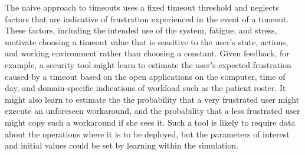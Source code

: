 \documentclass{acm_proc_article-sp}
\newcommand{\ignore}[1] {}
\begin{document}
\ignore{\subsection{An Alternative To The Standard Approach}}

The naive approach to timeouts uses a fixed timeout threshold and
neglects factors that are indicative of frustration experienced in the
event of a timeout. These factors, including the intended use of the
system, fatigue, and stress, motivate choosing a timeout value that is
sensitive to the user's state, actions, and working environment rather
than choosing a constant. Given feedback, for example, a security tool
might learn to estimate the user's expected frustration caused by a
timeout based on the open applications on the computer, time of day,
and domain-specific indications of workload such as the patient
roster.  \ignore{At the same time it might learn to estimate the
  probability of a vulnerability caused by a lengthened timeout in the
  same way and use the two values to reason about the tradeoffs of
  user frustration and near-term security.}  It might also learn to
estimate the the probability that a very frustrated user might execute
an unforeseen workaround, and the probability that a less frustrated
user might copy such a workaround if she sees it.  Such a tool is
likely to require data about the operations where it is to
be deployed, but the parameters of interest and initial values could
be set by learning within the simulation.

\ignore{\subsection{Why Does It Take So Long To Recognize Workarounds?}}

\ignore{\textcolor{red}{this is all speculation... just because users don't report circumvention doesn't mean that system designers will be unaware of it. some solid real-world examples would be nice here-- an image may also be useful: users of system circumvent -> no need for users to complain -> system designers don't hear about it -> security folks' mental models of system remains the same, but the system itself is flawed-- and usage of the system does not mesh with the mental model}}
\end{document}
